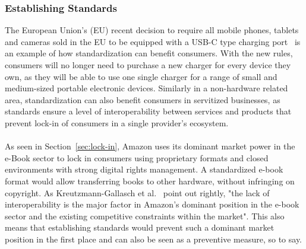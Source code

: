 \documentclass[sigplan,screen,nonacm]{acmart}
\begin{document}
\subsubsection{Establishing Standards}
The European Union's (EU) recent decision to require all mobile phones, tablets and cameras sold in the EU to be 
equipped with a USB-C type charging port~\cite{usbEU2022} is an example of how standardization can benefit consumers. 
With the new rules, consumers will no longer need to purchase a new charger for every device they own, as they 
will be able to use one single charger for a range of small and medium-sized portable electronic devices. 
Similarly in a non-hardware related area, standardization can also benefit consumers in servitized businesses, as 
standards ensure a level of interoperability between services and products that prevent lock-in of consumers in 
a single provider's ecosystem. 
\\\\
As seen in Section~\ref{sec:lock-in}, Amazon uses its dominant market power in the e-Book sector to lock in consumers using proprietary formats and closed environments with strong digital rights management. 
A standardized e-book format would allow transferring books to other hardware, without infringing on copyright. 
As Kreutzmann-Gallasch et al.~\cite{kreutzmann2022case} point out rightly, "the lack of interoperability is the major factor in Amazon's dominant position in the e-book sector and the existing competitive constraints within the market". 
This also means that establishing standards would prevent such a dominant market position in the first place and can also be seen as a preventive measure, so to say.
\end{document}
